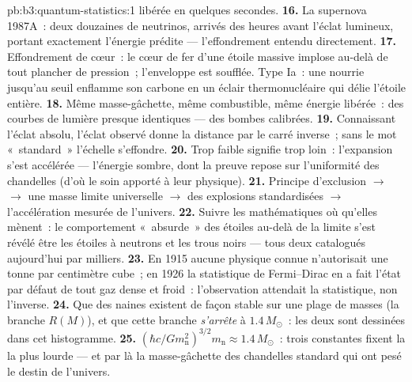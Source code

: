 \begin{solution}{pb:b3:quantum-statistics:1}
libérée en quelques secondes.
\textbf{16.} La supernova 1987A~: deux douzaines de neutrinos,
arrivés des heures avant l'éclat lumineux, portant exactement
l'énergie prédite --- l'effondrement entendu directement.
\textbf{17.} Effondrement de cœur~: le cœur de fer d'une étoile
massive implose au-delà de tout plancher de pression~; l'enveloppe
est soufflée. Type Ia~: une  nourrie jusqu'au seuil
enflamme son carbone en un éclair thermonucléaire qui délie
l'étoile entière.
\textbf{18.} Même masse-gâchette, même combustible, même énergie
libérée~: des courbes de lumière presque identiques --- des bombes
calibrées.
\textbf{19.} Connaissant l'éclat absolu, l'éclat observé donne la
distance par le carré inverse~; sans le mot «~standard~» l'échelle
s'effondre.
\textbf{20.} Trop faible signifie trop loin~: l'expansion s'est
accélérée --- l'énergie sombre, dont la preuve repose sur
l'uniformité des chandelles (d'où le soin apporté à leur physique).
\textbf{21.} Principe d'exclusion $\to$ 
$\to$ une masse limite universelle $\to$ des explosions
standardisées $\to$ l'accélération mesurée de l'univers.
\textbf{22.} Suivre les mathématiques où qu'elles mènent~: le
comportement «~absurde~» des étoiles au-delà de la limite s'est
révélé être les étoiles à neutrons et les trous noirs --- tous deux
catalogués aujourd'hui par milliers.
\textbf{23.} En 1915 aucune physique connue n'autorisait une
tonne par centimètre cube~; en 1926 la statistique de Fermi--Dirac
en a fait l'état par défaut de tout gaz dense et froid~:
l'observation attendait la statistique, non l'inverse.
\textbf{24.} Que des naines existent de façon stable sur une plage
de masses (la branche $R(M)$), et que cette branche \emph{s'arrête}
à $1.4\,M_\odot$~: les deux sont dessinées dans cet histogramme.
\textbf{25.} $(\hbar c/Gm_{\text{n}}^2)^{3/2}m_{\text{n}} \approx
1.4\,M_\odot$~: trois constantes fixent la  la plus
lourde --- et par là la masse-gâchette des chandelles standard qui
ont pesé le destin de l'univers.
\end{solution}
